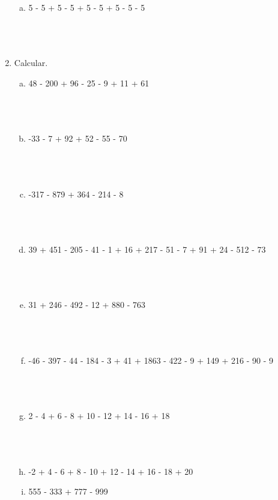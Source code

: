 \documentclass[a4paper,14pt]{article}
\begin{document}
\begin{multicols}{2}
\begin{enumerate}
\begin{enumerate}[a)]
    				\item 5 - 5 + 5 - 5 + 5 - 5 + 5 - 5 - 5 \\\\\\\\
    			\end{enumerate}
    			\item Calcular.
    			\begin{enumerate}[a)]
    				\item 48 - 200 + 96 - 25 - 9 + 11 + 61 \\\\\\\\
    				\item -33 - 7 + 92 + 52 - 55 - 70 \\\\\\\\
    				\item -317 - 879 + 364 - 214 - 8 \\\\\\\\
    				\item 39 + 451 - 205 - 41 - 1 + 16 + 217 - 51 - 7 + 91 + 24 - 512 - 73 \\\\\\\\
    				\item 31 + 246 - 492 - 12 + 880 - 763 \\\\\\\\
    				\item -46 - 397 - 44 - 184 - 3 + 41 + 1863 - 422 - 9 + 149 + 216 - 90 - 9 \\\\\\\\
    				\item 2 - 4 + 6 - 8 + 10 - 12 + 14 - 16 + 18 \\\\\\\\
    				\item -2 + 4 - 6 + 8 - 10 + 12 - 14 + 16 - 18 + 20 \\
    				\item 555 - 333 + 777 - 999 \\\\\\\\

\end{enumerate}
\end{enumerate}
\end{multicols}
\end{document}
